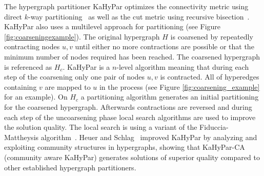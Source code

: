 \documentclass[a4paper,12pt,titlepage, BCOR7mm,headsepline]{scrbook}
\numberwithin{equation}{section}
\begin{document}
The hypergraph partitioner KaHyPar optimizes the connectivity metric using direct $k$-way partitioning~\cite{akhremtsev2017engineering} as well as the cut metric using recursive bisection~\cite{schlag2016k}.  
KaHyPar also uses a multilevel approach for partitioning (see Figure \ref{fig:coarseningexample}). The original hypergraph $H$ is coarsened by repeatedly contracting nodes $u,v$ until either no more contractions are possible or that the minimum number of nodes required has been reached. The coarsened hypergraph is referenced as $H_c$. KaHyPar is a $n$-level algorithm meaning that during each step of the coarsening only one pair of nodes $u, v$ is contracted. All of hyperedges containing $v$ are mapped to $u$ in the process (see Figure \ref{fig:coarsening_example} for an example). 
On $H_c$ a partitioning algorithm generates an initial partitioning for the coarsened hypergraph. Afterwards contractions are reversed and 
during each step of the uncoarsening phase local search algorithms are used to improve the solution quality. The local search is using a variant of the Fiduccia-Mattheysis algorithm~\cite{fiduccia1988linear}. 
Heuer and Schlag~\cite{heuer2017improving} improved KaHyPar by analyzing and exploiting community structures in hypergraphs, showing that KaHyPar-CA (community aware KaHyPar) generates solutions of superior quality compared to other established hypergraph partitioners.
\end{document}

